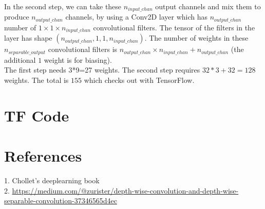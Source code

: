 \documentclass{article}
\begin{document}
In the second step, we can take these $n_{input\_chan}$ output channels and mix them to produce $n_{output\_chan}$ channels, by using a Conv2D layer which has $n_{output\_chan}$ number of $1\times1\times{n_{input\_chan}}$ convolutional filters. The tensor of the filters in the layer has shape $(n_{output\_chan},1,1,n_{input\_chan})$. The number of weights in these $n_{separable\_output}$ convolutional filters is $n_{output\_chan}\times{n_{input\_chan}}+n_{output\_chan}$ (the additional $1$ weight is for biasing).\\

The first step needs 3*9=27 weights. The second step requires $32*3+32=128$ weights. The total is $155$ which checks out with TensorFlow.

\section{TF Code}
\begin{center}
  
\end{center} 
\section{References}
1. Chollet's deeplearning book\\
2. \url{https://medium.com/@zurister/depth-wise-convolution-and-depth-wise-separable-convolution-37346565d4ec}
\end{document}
